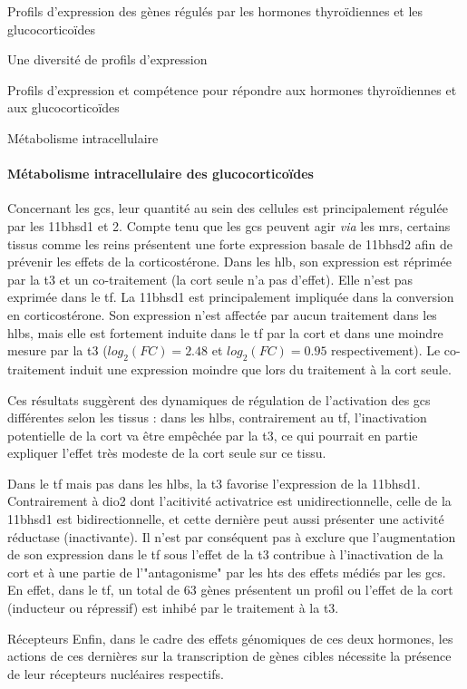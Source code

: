 \documentclass[../main.tex]{subfiles}
\begin{document}
\begin{chapter}{Profils d'expression des gènes régulés par les hormones thyroïdiennes et les glucocorticoïdes}
\begin{section}{Une diversité de profils d'expression}
\begin{subsection}{Profils d'expression et compétence pour répondre aux hormones thyroïdiennes et aux glucocorticoïdes}
\begin{subsubsection}{Métabolisme intracellulaire}
\paragraph{Métabolisme intracellulaire des glucocorticoïdes}
Concernant les \glspl{gc}, leur quantité au sein des cellules est principalement régulée par les \gls{11bhsd1} et 2.
Compte tenu que les \glspl{gc} peuvent agir \textit{via} les \glspl{mr}, certains tissus comme les reins présentent une forte expression basale de \gls{11bhsd2} afin de prévenir les effets de la corticostérone.
Dans les \gls{hlb}, son expression est réprimée par la \gls{t3} et un co-traitement (la \gls{cort} seule n'a pas d'effet).
Elle n'est pas exprimée dans le \gls{tf}.
La \gls{11bhsd1} est principalement impliquée dans la conversion en corticostérone.
Son expression n'est affectée par aucun traitement dans les \glspl{hlb}, mais elle est fortement induite dans le \gls{tf} par la \gls{cort} et dans une moindre mesure par la \gls{t3} ($log_2(FC)=2.48$ et $log_2(FC)=0.95$ respectivement).
Le co-traitement induit une expression moindre que lors du traitement à la \gls{cort} seule.
\par
Ces résultats suggèrent des dynamiques de régulation de l'activation des \glspl{gc} différentes selon les tissus :
dans les \glspl{hlb}, contrairement au \gls{tf}, l'inactivation potentielle de la \gls{cort} va être empêchée par la \gls{t3}, ce qui pourrait en partie expliquer l'effet très modeste de la \gls{cort} seule sur ce tissu.
\par
Dans le \gls{tf} mais pas dans les \glspl{hlb}, la \gls{t3} favorise l'expression de la \gls{11bhsd1}.
Contrairement à \gls{dio2} dont l'acitivité activatrice est unidirectionnelle, celle de la \gls{11bhsd1} est bidirectionnelle, et cette dernière peut aussi présenter une activité réductase (inactivante).
Il n'est par conséquent pas à exclure que l'augmentation de son expression dans le \gls{tf} sous l'effet de la \gls{t3} contribue à l'inactivation de la \gls{cort} et à une partie de l'"antagonisme" par les \glspl{ht} des effets médiés par les \glspl{gc}.
En effet, dans le \gls{tf}, un total de 63 gènes présentent un profil ou l'effet de la \gls{cort} (inducteur ou répressif) est inhibé par le traitement à la \gls{t3}.
\end{subsubsection}

\begin{subsubsection}{Récepteurs}
Enfin, dans le cadre des effets génomiques de ces deux hormones, les actions de ces dernières sur la transcription de gènes cibles nécessite la présence de leur récepteurs nucléaires respectifs.


\end{subsubsection}
\end{subsection}
\end{section}
\end{chapter}
\end{document}
